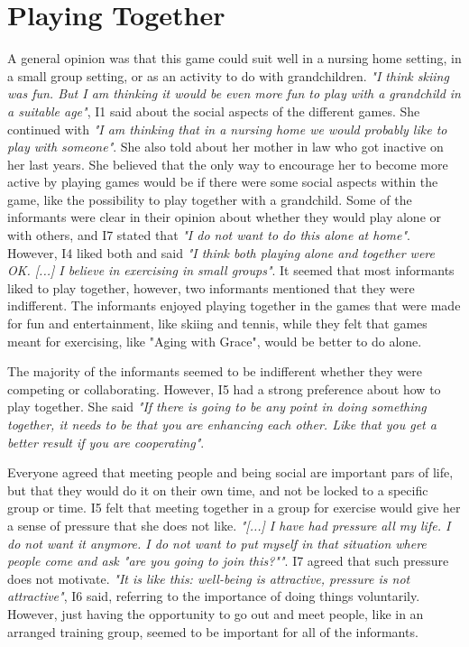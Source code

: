 \section{Playing Together}
A general opinion was that this game could suit well in a nursing home setting, in a small group setting, or as an activity to do with grandchildren. \emph{"I think skiing was fun. But I am thinking it would be even more fun to play with a grandchild in a suitable age"}, I1 said about the social aspects of the different games. She continued with \emph{"I am thinking that in a nursing home we would probably like to play with someone"}. She also told about her mother in law who got inactive on her last years. She believed that the only way to encourage her to become more active by playing games would be if there were some social aspects within the game, like the possibility to play together with a grandchild. Some of the informants were clear in their opinion about whether they would play alone or with others, and I7 stated that \emph{"I do not want to do this alone at home"}. However, I4 liked both and said \emph{"I think both playing alone and together were OK. [...] I believe in exercising in small groups"}. It seemed that most informants liked to play together, however, two informants mentioned that they were indifferent. The informants enjoyed playing together in the games that were made for fun and entertainment, like skiing and tennis, while they felt that games meant for exercising, like "Aging with Grace", would be better to do alone.  

The majority of the informants seemed to be indifferent whether they were competing or collaborating. However, I5 had a strong preference about how to play together. She said
\emph{"If there is going to be any point in doing something together, it needs to be that you are enhancing each other. Like that you get a better result if you are cooperating"}.

Everyone agreed that meeting people and being social are important pars of life, but that they would do it on their own time, and not be locked to a specific group or time. I5 felt that meeting together in a group for exercise would give her a sense of pressure that she does not like. \emph{"[...] I have had pressure all my life. I do not want it anymore. I do not want to put myself in that situation where people come and ask "are you going to join this?""}. I7 agreed that such pressure does not motivate. \emph{"It is like this: well-being is attractive, pressure is not attractive"}, I6 said, referring to the importance of doing things voluntarily. However, just having the opportunity to go out and meet people, like in an arranged training group, seemed to be important for all of the informants. 

